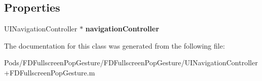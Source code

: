 \subsection*{Properties}
\begin{DoxyCompactItemize}
\item 
\mbox{\label{interface___f_d_fullscreen_pop_gesture_recognizer_delegate_a2e726eac0bae472d96a0a930b2ef9c31}} 
U\+I\+Navigation\+Controller $\ast$ {\bfseries navigation\+Controller}
\end{DoxyCompactItemize}


The documentation for this class was generated from the following file\+:\begin{DoxyCompactItemize}
\item 
Pods/\+F\+D\+Fullscreen\+Pop\+Gesture/\+F\+D\+Fullscreen\+Pop\+Gesture/U\+I\+Navigation\+Controller+\+F\+D\+Fullscreen\+Pop\+Gesture.\+m\end{DoxyCompactItemize}
